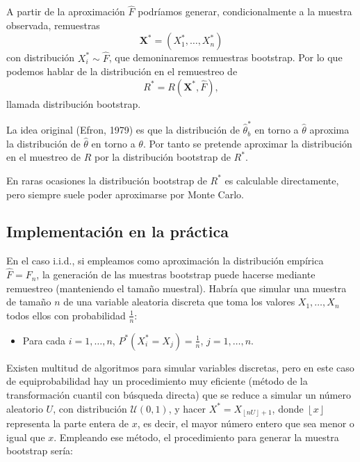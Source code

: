 \documentclass[
]{book}
\providecommand{\tightlist}{%
  \setlength{\itemsep}{0pt}\setlength{\parskip}{0pt}}
\renewcommand{\mathbf}[1]{\symbf{#1}}
\theoremstyle{break}
\theoremstyle{nonumberplain}
\begin{document}
A partir de la aproximación \(\hat{F}\) podríamos generar, condicionalmente a la muestra observada,
remuestras
\[\mathbf{X}^{\ast}=\left( X_1^{\ast},\ldots ,X_n^{\ast} \right)\]
con distribución \(X_i^{\ast} \sim \hat{F}\), que demoninaremos remuestras bootstrap.
Por lo que podemos hablar de la distribución en el remuestreo de
\[R^{\ast}=R\left( \mathbf{X}^{\ast},\hat{F} \right),\]
llamada distribución bootstrap.

La idea original (Efron, 1979) es que la distribución
de \(\hat{\theta}_{b}^{\ast }\) en torno a \(\hat{\theta}\) aproxima la
distribución de \(\hat{\theta}\) en torno a \(\theta\).
Por tanto se pretende aproximar la distribución en el muestreo de \(R\) por la
distribución bootstrap de \(R^{\ast}\).

En raras ocasiones la distribución bootstrap de \(R^{\ast}\) es
calculable directamente, pero siempre suele poder aproximarse por
Monte Carlo.

\subsection{Implementación en la práctica}\label{intro-implementacion}

En el caso i.i.d., si empleamos como aproximación la distribución empírica \(\hat{F}=F_n\),
la generación de las muestras bootstrap puede hacerse mediante remuestreo
(manteniendo el tamaño muestral). Habría que simular una muestra de tamaño \(n\)
de una variable aleatoria discreta que toma los valores
\(X_1,\ldots ,X_n\) todos ellos con probabilidad \(\frac{1}{n}\):

\begin{itemize}
\tightlist
\item
  Para cada \(i=1,\ldots, n\),
  \(P^{\ast}\left( X_i^{\ast}=X_j \right) =
  \frac{1}{n}\), \(j=1,\ldots ,n\).
\end{itemize}

Existen multitud de algoritmos para simular variables discretas, pero en
este caso de equiprobabilidad hay un procedimiento muy eficiente (método
de la transformación cuantil con búsqueda directa) que se reduce a
simular un número aleatorio \(U\), con distribución \(\mathcal{U}\left( 0,1 \right)\),
y hacer \(X^{\ast}=X_{\left\lfloor nU\right\rfloor +1}\), donde \(\left\lfloor x\right\rfloor\)
representa la parte entera de \(x\), es decir, el mayor número entero que
sea menor o igual que \(x\).
Empleando ese método, el procedimiento para generar la muestra bootstrap sería:
\end{document}
